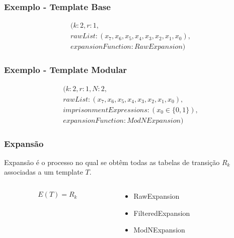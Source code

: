 \documentclass[aspectratio=43,hyperref={pdfpagelabels=false}]{beamer}
\begin{document}
\begin{frame}
    \frametitle{Exemplo -  Template Base}
    
    \begin{equation}
    \begin{split}
    (k:2, r:1, \\rawList:(x_7,x_6,x_5,x_4,x_3,x_2,x_1,x_0),  \\expansionFunction:RawExpansion)
    \end{split}
    \end{equation}
\end{frame}

\begin{frame}
    \frametitle{Exemplo -  Template Modular}
  
    \begin{equation}
    \begin{split}
    (k:2, r:1, N:2, \\rawList:(x_7,x_6,x_5,x_4,x_3,x_2,x_1,x_0),  \\imprisonmentExpressions:(x_0 \in \{0,1\}), \\expansionFunction:ModNExpansion)
    \end{split}
    \end{equation}
\end{frame}

\begin{frame}
	\frametitle{Expansão}
	Expansão é o processo no qual se obtêm todas as tabelas de transição $R_k$ associadas a um template $T$.
    \begin{columns}
    \begin{column}{5cm}
        \begin{equation}
        E(T)=R_k
        \end{equation}
    \end{column}
    \pause
    \begin{column}{5cm}
     \begin{itemize}
           \item RawExpansion
           \item FilteredExpansion
           \item ModNExpansion
     \end{itemize}
    \end{column}
    \end{columns}
 \end{frame}
\end{document}
